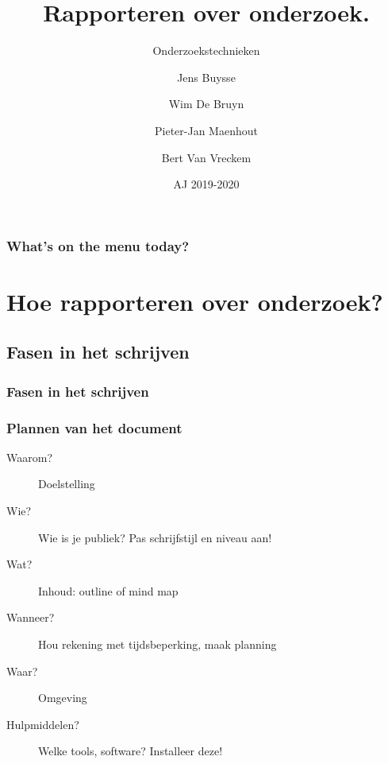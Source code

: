 \documentclass[aspectratio=169]{beamer}
\title{Rapporteren over onderzoek.}
\subtitle{Onderzoekstechnieken}
\author{Jens Buysse \and Wim {De Bruyn} \and Pieter-Jan Maenhout \and Bert {Van Vreckem}}
\date{AJ 2019-2020}
\begin{document}
\begin{frame}
  \maketitle
\end{frame}

\begin{frame}
  \frametitle{What's on the menu today?}
  
  \tableofcontents
\end{frame}


\section{Hoe rapporteren over onderzoek?}

\subsection{Fasen in het schrijven}


\begin{frame}
  \frametitle{Fasen in het schrijven}
  \centering
\end{frame}

\begin{frame}
  \frametitle{Plannen van het document}
  
  \begin{description}
    \item[Waarom?] Doelstelling
    \item[Wie?] Wie is je publiek? Pas schrijfstijl en niveau aan!
    \item[Wat?] Inhoud: outline of mind map
    \item[Wanneer?] Hou rekening met tijdsbeperking, maak planning
    \item[Waar?] Omgeving
    \item[Hulpmiddelen?] Welke tools, software? Installeer deze!
  \end{description}
\end{frame}
\end{document}
